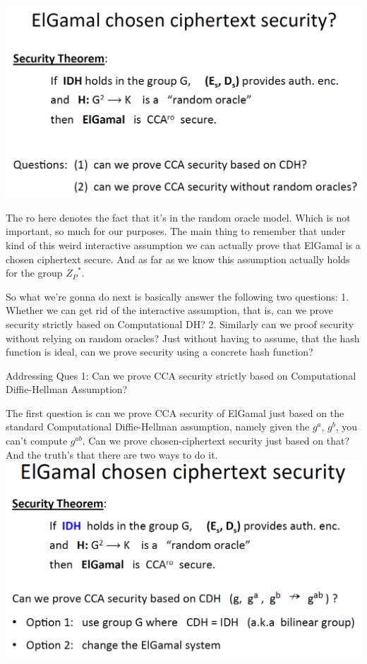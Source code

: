 \documentclass[11pt]{article}
\makeatletter
\def\maxwidth{\ifdim\Gin@nat@width>\linewidth\linewidth
    \else\Gin@nat@width\fi}
\let\Oldincludegraphics\includegraphics
\renewcommand{\includegraphics}[1]{\Oldincludegraphics[width=.8\maxwidth]{#1}}
\makeatother
\begin{document}
\includegraphics{./Images/ElGamal-CCASecure.png}

The ro here denotes the fact that it's in the random oracle model. Which
is not important, so much for our purposes. The main thing to remember
that under kind of this weird interactive assumption we can actually
prove that ElGamal is a chosen ciphertext secure. And as far as we know
this assumption actually holds for the group \({Z_{P}}^{*}\).

So what we're gonna do next is basically answer the following two
questions: 1. Whether we can get rid of the interactive assumption, that
is, can we prove security strictly based on Computational DH? 2.
Similarly can we proof security without relying on random oracles? Just
without having to assume, that the hash function is ideal, can we prove
security using a concrete hash function?

Addressing Ques 1: Can we prove CCA security strictly based on
Computational Diffie-Hellman Assumption?

The first question is can we prove CCA security of ElGamal just based on
the standard Computational Diffie-Hellman assumption, namely given the
\(g^a\), \(g^b\), you can't compute \(g^{ab}\). Can we prove
chosen-ciphertext security just based on that? And the truth's that
there are two ways to do it.
\includegraphics{./Images/StrictCDHOptions.png}
\end{document}
